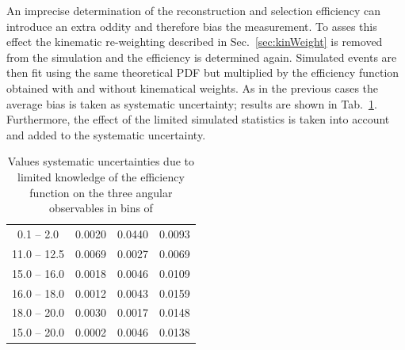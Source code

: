 An imprecise determination of the reconstruction and selection efficiency can introduce an extra oddity
and therefore bias the measurement. To asses this effect the kinematic re-weighting described in Sec.~\ref{sec:kinWeight}
is removed from the simulation and the efficiency is determined again.
Simulated events are then fit using the same theoretical PDF but multiplied by the efficiency
function obtained with and without kinematical weights. As in the previous cases the average bias 
is taken as systematic uncertainty; results are shown in Tab.~\ref{tab:AfbeffSys}.
Furthermore, the effect of the limited simulated statistics is taken into account and 
added to the systematic uncertainty.
%
%
\begin{table}[h]
\centering
\caption{Values systematic uncertainties due to limited knowledge of the efficiency
function on the three angular observables in bins of \qsq}
\begin{tabular}{c|ccc}
 \boldmath{ \qsq [\gevgevcccc] }  &  \boldmath{ \afbl }   &  \boldmath{ \fl} &  \boldmath{ \afbh} \\ \hline
\phantom{x}0.1 -- 2.0\phantom{x}    	 & 0.0020  & 0.0440 &  0.0093\\ 
11.0 -- 12.5  					 & 0.0069  & 0.0027 &  0.0069\\
15.0 -- 16.0  					 & 0.0018  & 0.0046 &  0.0109\\
16.0 -- 18.0  					 & 0.0012  & 0.0043 &  0.0159\\
18.0 -- 20.0  					 & 0.0030  & 0.0017 &  0.0148\\
\hline
15.0 -- 20.0  					 & 0.0002  & 0.0046 &  0.0138\\
\end{tabular}
\label{tab:AfbeffSys}
\end{table}
